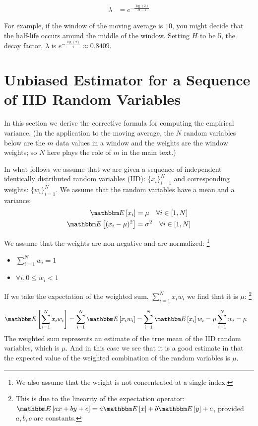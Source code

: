 \documentclass{article}
\newcommand{\E}[1]{\mathbbm E\left[#1\right]}
\begin{document}
\begin{align}
    \lambda &= e^{-\frac{\log(2)}{H-1}}
\end{align}

For example, if the window of the moving average is $10$, you might decide that the
half-life occurs around the middle of the window. Setting $H$ to be 5, the decay factor, $\lambda$ 
is $e^{-\frac{\log(2)}{4}} \approx 0.8409$.

\newpage

\appendix

\section{Unbiased Estimator for a Sequence of IID Random Variables}
In this section we derive the corrective formula for computing the empirical variance.
(In the application to the moving average, the $N$ random variables below
are the $m$ data values in a window and the weights are the window weights;
so $N$ here plays the role of $m$ in the main text.)

In what follows we assume that we are given a sequence of independent identically distributed random variables (IID):
$\{x_i\}_{i=1}^N$ and corresponding weights: $\{w_i\}_{i=1}^N$.
We assume that the random variables have a mean and a variance:
\begin{align}
    \E{x_i} &= \mu  \quad \forall i \in [1, N] \\
    \E{(x_i - \mu)^2} &= \sigma^2 \quad \forall i \in [1, N]
\end{align}

We assume that the weights are non-negative and are normalized:%
\footnote{We also assume that the weight is not concentrated at a
single index.}
\begin{itemize}
    \item $\sum_{i=1}^N w_i = 1$
    \item $\forall i, 0 \le w_i < 1$
\end{itemize}

If we take the expectation of the weighted sum, $\sum_{i=1}^N x_i w_i$ we find that it is $\mu$:%
\footnote{This is due to the linearity of the expectation operator:
$\E{a x + b y + c} = a \E{x} + b \E{y} + c$, provided $a,b,c$ are constants.}

\begin{align}
    \E{\sum_{i=1}^N x_i w_i} &= \sum_{i=1}^N \E{x_i w_i} = \sum_{i=1}^N \E{x_i} w_i = \mu \sum_{i=1}^N w_i = \mu 
\end{align}
The weighted sum represents an estimate of the true mean of the IID random variables, which is $\mu$.
And in this case we see that it is a good estimate in that the expected value of the weighted combination
of the random variables is $\mu$. 
\end{document}
